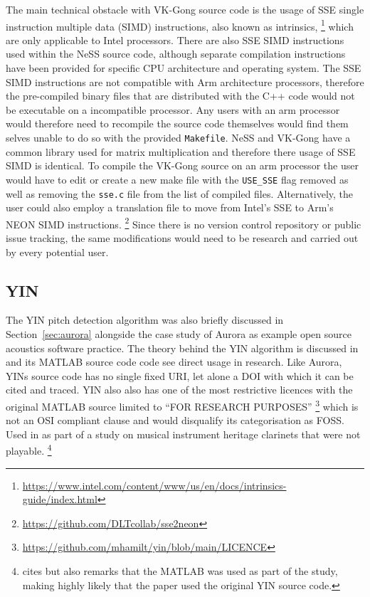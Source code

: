 The main technical obstacle with VK-Gong source code is the usage of SSE single instruction multiple data (SIMD) instructions, also known as intrinsics,
\footnote{\url{https://www.intel.com/content/www/us/en/docs/intrinsics-guide/index.html}}
which are only applicable to Intel processors. There are also SSE SIMD instructions used within the NeSS source code, although separate compilation instructions have been provided for specific CPU architecture and operating system. The SSE SIMD instructions are not compatible with Arm architecture processors, therefore the pre-compiled binary files that are distributed with the C\textsc{++} code would not be executable on a incompatible processor. Any users with an arm processor would therefore need to recompile the source code themselves would find them selves unable to do so with the provided \texttt{Makefile}. NeSS and VK-Gong have a common library used for matrix multiplication and therefore there usage of SSE SIMD is identical. To compile the VK-Gong source on an arm processor the user would have to edit or create a new make file with the \texttt{USE_SSE} flag removed as well as removing the \texttt{sse.c} file from the list of compiled files. Alternatively, the user could also employ a translation file to move from Intel's SSE to Arm's NEON SIMD instructions.
\footnote{\url{https://github.com/DLTcollab/sse2neon}}
Since there is no version control repository or public issue tracking, the same modifications would need to be research and carried out by every potential user.

\subsection{YIN}
The YIN pitch detection algorithm was also briefly discussed in Section~\ref{sec:aurora} alongside the case study of Aurora as example open source acoustics software practice.
The theory behind the YIN algorithm is discussed in \textcite{cheveigne_yin_2002} and its MATLAB source code code see direct usage in research.
Like Aurora, YINs source code has no single fixed URI, let alone a DOI with which it can be cited and traced. YIN also also has one of the most restrictive licences with the original MATLAB source limited to ``FOR RESEARCH PURPOSES''
\footnote{\url{https://github.com/mhamilt/yin/blob/main/LICENCE}}
which is not an OSI compliant clause and would disqualify its categorisation as FOSS.
Used in \textcite{bowen_assessing_2019} as part of a study on musical instrument heritage clarinets that were not playable.
\footnote{\textcite{bowen_assessing_2019} cites \textcite{cheveigne_yin_2002} but also remarks that the MATLAB was used as part of the study, making highly likely that the paper used the original YIN source code.}


